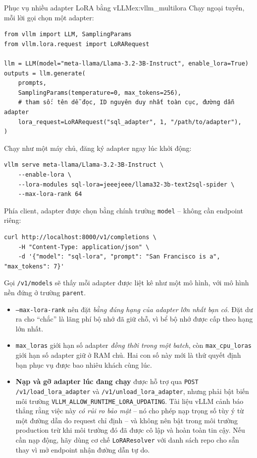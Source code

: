 \begin{example}{Phục vụ nhiều adapter LoRA bằng vLLM}{ex:vllm_multilora}
Chạy ngoại tuyến, mỗi lời gọi chọn một adapter:
\begin{verbatim}
from vllm import LLM, SamplingParams
from vllm.lora.request import LoRARequest

llm = LLM(model="meta-llama/Llama-3.2-3B-Instruct", enable_lora=True)
outputs = llm.generate(
    prompts,
    SamplingParams(temperature=0, max_tokens=256),
    # tham số: tên dễ đọc, ID nguyên duy nhất toàn cục, đường dẫn adapter
    lora_request=LoRARequest("sql_adapter", 1, "/path/to/adapter"),
)
\end{verbatim}

Chạy như một máy chủ, đăng ký adapter ngay lúc khởi động:
\begin{verbatim}
vllm serve meta-llama/Llama-3.2-3B-Instruct \
    --enable-lora \
    --lora-modules sql-lora=jeeejeee/llama32-3b-text2sql-spider \
    --max-lora-rank 64
\end{verbatim}

Phía client, adapter được chọn bằng chính trường \texttt{model} -- không cần endpoint riêng:
\begin{verbatim}
curl http://localhost:8000/v1/completions \
    -H "Content-Type: application/json" \
    -d '{"model": "sql-lora", "prompt": "San Francisco is a", "max_tokens": 7}'
\end{verbatim}
Gọi \texttt{/v1/models} sẽ thấy mỗi adapter được liệt kê như một mô hình, với mô hình nền đứng ở trường \texttt{parent}.
\end{example}

\begin{itemize}
	\item \texttt{--max-lora-rank} nên đặt \emph{bằng đúng hạng của adapter lớn nhất bạn có}. Đặt dư ra cho “chắc” là lãng phí bộ nhớ đã giữ chỗ, vì bể bộ nhớ được cấp theo hạng lớn nhất.
	\item \texttt{max\_loras} giới hạn số adapter \emph{đồng thời trong một batch}, còn \texttt{max\_cpu\_loras} giới hạn số adapter giữ ở RAM chủ. Hai con số này mới là thứ quyết định bạn phục vụ được bao nhiêu khách cùng lúc.
	\item \textbf{Nạp và gỡ adapter lúc đang chạy} được hỗ trợ qua \texttt{POST /v1/load\_lora\_adapter} và \texttt{/\allowbreak v1/\allowbreak unload\_\allowbreak lora\_\allowbreak adapter}, nhưng phải bật biến môi trường \texttt{VLLM\_\allowbreak ALLOW\_\allowbreak RUNTIME\_\allowbreak LORA\_\allowbreak UPDATING}. Tài liệu vLLM cảnh báo thẳng rằng việc này \emph{có rủi ro bảo mật} -- nó cho phép nạp trọng số tùy ý từ một đường dẫn do request chỉ định -- và không nên bật trong môi trường production trừ khi môi trường đó đã được cô lập và hoàn toàn tin cậy. Nếu cần nạp động, hãy dùng cơ chế \texttt{LoRAResolver} với danh sách repo cho sẵn thay vì mở endpoint nhận đường dẫn tự do.
\end{itemize}

